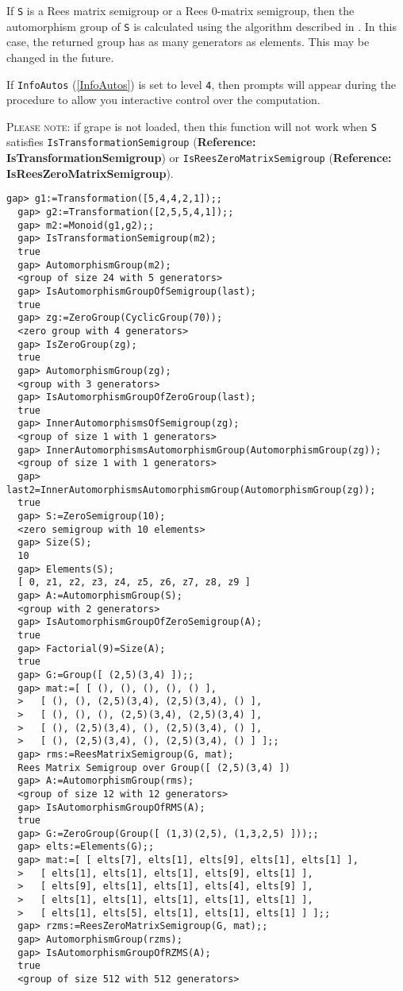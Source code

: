 \documentclass[a4paper,11pt]{report}
\begin{document}
{{{ If \texttt{S} is a Rees matrix semigroup or a Rees 0-matrix semigroup, then the automorphism
group of \texttt{S} is calculated using the algorithm described in \cite[Section 2]{computing}. In this case, the returned group has as many generators as elements. This
may be changed in the future.

 If \texttt{InfoAutos} (\ref{InfoAutos}) is set to level \texttt{4}, then prompts will appear during the procedure to allow you interactive
control over the computation. 

 \textsc{Please note:} if \textsf{grape} is not loaded, then this function will not work when \texttt{S} satisfies \texttt{IsTransformationSemigroup} (\textbf{Reference: IsTransformationSemigroup}) or \texttt{IsReesZeroMatrixSemigroup} (\textbf{Reference: IsReesZeroMatrixSemigroup}). 
\begin{Verbatim}[fontsize=\small,frame=single,label=Example]
  gap> g1:=Transformation([5,4,4,2,1]);;
  gap> g2:=Transformation([2,5,5,4,1]);;
  gap> m2:=Monoid(g1,g2);;
  gap> IsTransformationSemigroup(m2);
  true
  gap> AutomorphismGroup(m2);
  <group of size 24 with 5 generators>
  gap> IsAutomorphismGroupOfSemigroup(last);
  true
  gap> zg:=ZeroGroup(CyclicGroup(70));
  <zero group with 4 generators>
  gap> IsZeroGroup(zg);
  true
  gap> AutomorphismGroup(zg);
  <group with 3 generators>
  gap> IsAutomorphismGroupOfZeroGroup(last);
  true
  gap> InnerAutomorphismsOfSemigroup(zg);
  <group of size 1 with 1 generators>
  gap> InnerAutomorphismsAutomorphismGroup(AutomorphismGroup(zg));
  <group of size 1 with 1 generators>
  gap> last2=InnerAutomorphismsAutomorphismGroup(AutomorphismGroup(zg));
  true
  gap> S:=ZeroSemigroup(10);
  <zero semigroup with 10 elements>
  gap> Size(S);
  10
  gap> Elements(S);
  [ 0, z1, z2, z3, z4, z5, z6, z7, z8, z9 ]
  gap> A:=AutomorphismGroup(S);
  <group with 2 generators>
  gap> IsAutomorphismGroupOfZeroSemigroup(A);
  true
  gap> Factorial(9)=Size(A);
  true
  gap> G:=Group([ (2,5)(3,4) ]);;
  gap> mat:=[ [ (), (), (), (), () ], 
  >   [ (), (), (2,5)(3,4), (2,5)(3,4), () ], 
  >   [ (), (), (), (2,5)(3,4), (2,5)(3,4) ], 
  >   [ (), (2,5)(3,4), (), (2,5)(3,4), () ], 
  >   [ (), (2,5)(3,4), (), (2,5)(3,4), () ] ];;
  gap> rms:=ReesMatrixSemigroup(G, mat);
  Rees Matrix Semigroup over Group([ (2,5)(3,4) ])
  gap> A:=AutomorphismGroup(rms);
  <group of size 12 with 12 generators>
  gap> IsAutomorphismGroupOfRMS(A);
  true
  gap> G:=ZeroGroup(Group([ (1,3)(2,5), (1,3,2,5) ]));;
  gap> elts:=Elements(G);;
  gap> mat:=[ [ elts[7], elts[1], elts[9], elts[1], elts[1] ], 
  >   [ elts[1], elts[1], elts[1], elts[9], elts[1] ], 
  >   [ elts[9], elts[1], elts[1], elts[4], elts[9] ], 
  >   [ elts[1], elts[1], elts[1], elts[1], elts[1] ], 
  >   [ elts[1], elts[5], elts[1], elts[1], elts[1] ] ];;
  gap> rzms:=ReesZeroMatrixSemigroup(G, mat);;
  gap> AutomorphismGroup(rzms);
  gap> IsAutomorphismGroupOfRZMS(A);
  true
  <group of size 512 with 512 generators>
  	

\end{Verbatim}}}}
\end{document}
